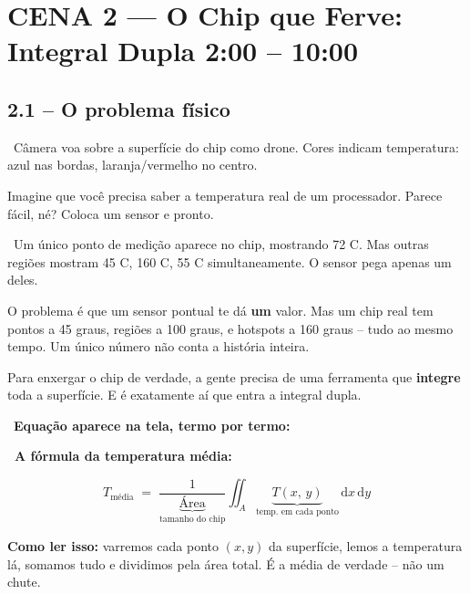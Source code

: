 \section{CENA 2 --- O Chip que Ferve: Integral Dupla \hfill \normalfont\small\color{corTempo}2:00 -- 10:00}

\subsection{2.1 -- O problema físico}

\begin{visual}
\faFilm\ Câmera voa sobre a superfície do chip como drone. Cores indicam temperatura:
azul nas bordas, laranja/vermelho no centro.
\end{visual}

\begin{fala}
Imagine que você precisa saber a temperatura real de um processador.
Parece fácil, né? Coloca um sensor e pronto.
\end{fala}

\begin{visual}
\faFilm\ Um único ponto de medição aparece no chip, mostrando 72 {\textdegree}C.
Mas outras regiões mostram 45 {\textdegree}C, 160 {\textdegree}C, 55 {\textdegree}C simultaneamente.
O sensor pega apenas um deles.
\end{visual}

\begin{fala}
O problema é que um sensor pontual te dá \textbf{um} valor. Mas um chip real
tem pontos a 45 graus, regiões a 100 graus, e hotspots a 160 graus --
tudo ao mesmo tempo. Um único número não conta a história inteira.
\end{fala}

\begin{fala}
Para enxergar o chip de verdade, a gente precisa de uma ferramenta que
\textbf{integre} toda a superfície. E é exatamente aí que entra a integral dupla.
\end{fala}

\begin{tela}
\faDesktop\ \textbf{Equação aparece na tela, termo por termo:}
\end{tela}

\begin{mathblock}
\textbf{\color{corMath}\faSuperscript\ A fórmula da temperatura média:}

\vspace{6pt}
\[
  T_{\text{média}}
  \;=\;
  \frac{1}{\underbrace{\text{Área}}_{\text{tamanho do chip}}}
  \iint_{A}
  \underbrace{T(x,\,y)}_{\text{temp.\ em cada ponto}}
  \,\mathrm{d}x\,\mathrm{d}y
\]

\vspace{4pt}
{\small\color{gray}
\textbf{Como ler isso:} varremos cada ponto $(x,y)$ da superfície, lemos a temperatura
lá, somamos tudo e dividimos pela área total. É a média de verdade -- não um chute.}
\end{mathblock}

